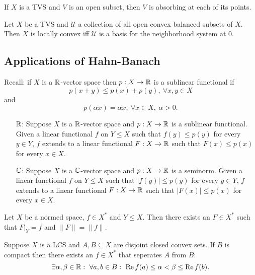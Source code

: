 \begin{remark}
  If $X$ is a TVS and $V$ is an open subset, then $V$ is absorbing at each of its points.
\end{remark}

\begin{corollary}
  Let $X$ be a TVS and $\mathcal{U}$ a collection of all open convex balanced subsets of $X$.
  Then $X$ is locally convex iff $\mathcal{U}$ is a basis for the neighborhood system at $0$.
\end{corollary}

\subsection{Applications of Hahn-Banach}

Recall: if $X$ is a $\mathbb {R}$-vector space then $p: X \to \mathbb {R}$
is a sublinear functional if $$p(x + y) \leq p(x) + p(y),\ \forall x, y \in X$$ and $$p(\alpha x) = \alpha x,\ \forall x \in X,\ \alpha > 0.$$

\begin{theorem}
  \begin{itemize}
    \item[$\mathbb {R}$:] Suppose $X$ is a $\mathbb {R}$-vector space and $p: X \to \mathbb {R}$ is a sublinear functional.
    Given a linear functional $f$ on $Y \leq X$ such that $f(y) \leq p(y)$ for every $y \in Y$,
    $f$ extends to a linear functional $F: X \to \mathbb {R}$ such that $F(x) \leq p(x)$ for every $x \in X$.
    \item[$\mathbb {C}$:] Suppose $X$ is a $\mathbb {C}$-vector space and $p: X \to \mathbb {R}$ is a seminorm.
    Given a linear functional $f$ on $Y \leq X$ such that $|f(y)| \leq p(y)$ for every $y \in Y$,
    $f$ extends to a linear functional $F: X \to \mathbb {R}$ such that $|F(x)| \leq p(x)$ for every $x \in X$.
  \end{itemize}
\end{theorem}

\begin{corollary}
  Let $X$ be a normed space, $f \in X^*$ and $Y \leq X$.
  Then there exists an $F \in X^*$ such that $F\big|_Y = f$ and $\|F\| = \| f\|$.
\end{corollary}

\begin{corollary}
  Suppose $X$ is a LCS and $A, B \subseteq X$ are disjoint closed convex sets.
  If $B$ is compact then there exists an $f \in X^*$ that seperates $A$ from $B$:
  $$\exists \alpha, \beta \in \mathbb {R}:\ \forall a, b \in B:\ \operatorname{Re} f(a) \leq \alpha < \beta \leq \operatorname{Re} f(b).$$
\end{corollary}

